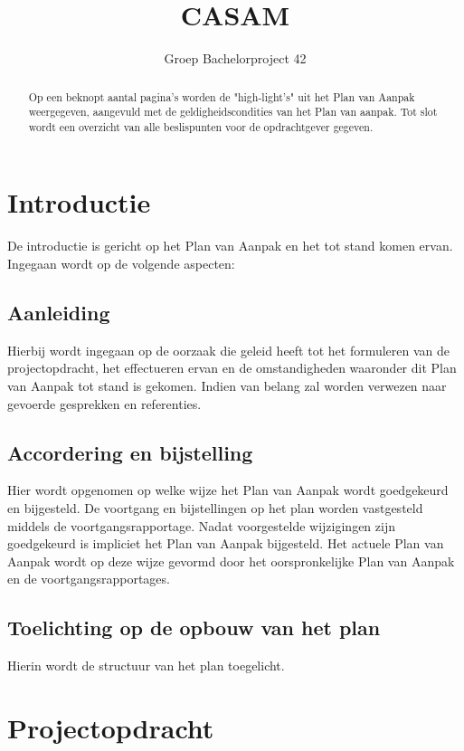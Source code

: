 \documentclass{article}
\title{CASAM}
\author{Groep Bachelorproject 42}
\date{}
\begin{document}
\maketitle
\thispagestyle{empty}

\begin{abstract}

Op een beknopt aantal pagina's worden de "high-light's" uit het Plan van Aanpak weergegeven,
aangevuld met de geldigheidscondities van het Plan van aanpak.
Tot slot wordt een overzicht van alle beslispunten voor de opdrachtgever gegeven.

\end{abstract}

\section{Introductie}

De introductie is gericht op het Plan van Aanpak en het tot stand komen ervan.
Ingegaan wordt op de volgende aspecten:

\subsection{Aanleiding}
Hierbij wordt ingegaan op de oorzaak die geleid heeft tot het formuleren van de projectopdracht,
het effectueren ervan en de omstandigheden waaronder dit Plan van Aanpak tot stand is gekomen.
Indien van belang zal worden verwezen naar gevoerde gesprekken en referenties.

\subsection{Accordering en bijstelling}
Hier wordt opgenomen op welke wijze het Plan van Aanpak wordt goedgekeurd en bijgesteld.
De voortgang en bijstellingen op het plan worden vastgesteld middels de voortgangsrapportage.
Nadat voorgestelde wijzigingen zijn goedgekeurd is impliciet het Plan van Aanpak bijgesteld.
Het actuele Plan van Aanpak wordt op deze wijze gevormd door het oorspronkelijke Plan van Aanpak en de voortgangsrapportages.

\subsection{Toelichting op de opbouw van het plan}
Hierin wordt de structuur van het plan toegelicht.

\section{Projectopdracht}
\end{document}

